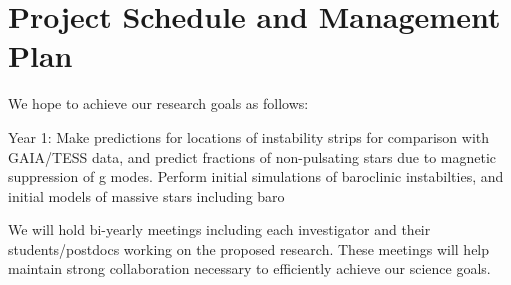 \section{Project Schedule and Management Plan}

We hope to achieve our research goals as follows:

Year 1: Make predictions for locations of instability strips for comparison with GAIA/TESS data, and predict fractions of non-pulsating stars due to magnetic suppression of g modes. Perform initial simulations of baroclinic instabilties, and initial models of massive stars including baro 

We will  hold bi-yearly meetings including each investigator and their students/postdocs working on the proposed research. These meetings will help maintain strong collaboration necessary to efficiently achieve our science goals.

